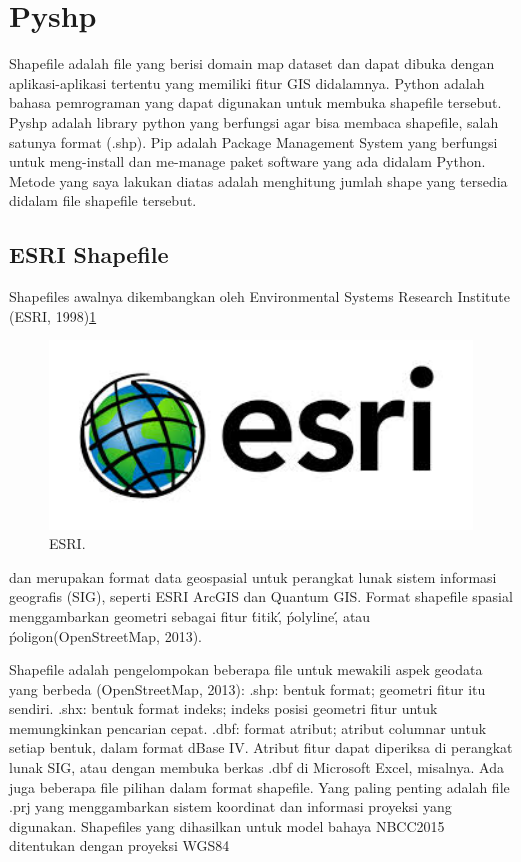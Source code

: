 
\section{Pyshp}
Shapefile adalah file yang berisi domain map dataset dan dapat dibuka dengan aplikasi-aplikasi tertentu yang memiliki fitur GIS didalamnya.
Python adalah bahasa pemrograman yang dapat digunakan untuk membuka shapefile tersebut.
Pyshp adalah library python yang berfungsi agar bisa membaca shapefile, salah satunya format (.shp).
Pip adalah Package Management System yang berfungsi untuk meng-install dan me-manage paket software yang ada didalam Python.
Metode yang saya lakukan diatas adalah menghitung jumlah shape yang tersedia didalam file shapefile tersebut.

\subsection{ESRI Shapefile}
	
Shapefiles awalnya dikembangkan oleh Environmental Systems Research Institute (ESRI, 1998)\ref{esri}
	\begin{figure}[ht]
	\centerline{\includegraphics[width=1\textwidth]{figures/esri.JPG}}
	\caption{ESRI.}
	\label{esri}
	\end{figure}dan merupakan format data geospasial untuk perangkat lunak sistem informasi geografis (SIG), seperti ESRI ArcGIS dan Quantum GIS.
Format shapefile spasial menggambarkan geometri sebagai fitur \'titik\', \'polyline\', atau \'poligon\'\cite{halchuk2014fifth}(OpenStreetMap, 2013).

Shapefile adalah pengelompokan beberapa file untuk mewakili aspek geodata yang berbeda (OpenStreetMap, 2013):
.shp: bentuk format; geometri fitur itu sendiri.
.shx: bentuk format indeks; indeks posisi geometri fitur untuk memungkinkan pencarian cepat.
.dbf: format atribut; atribut columnar untuk setiap bentuk, dalam format dBase IV.
Atribut fitur dapat diperiksa di perangkat lunak SIG, atau dengan membuka berkas .dbf di Microsoft Excel, misalnya. Ada juga beberapa file pilihan dalam format shapefile. Yang paling penting adalah file .prj yang menggambarkan sistem koordinat dan informasi proyeksi yang digunakan. Shapefiles yang dihasilkan untuk model bahaya NBCC2015 ditentukan dengan proyeksi WGS84

